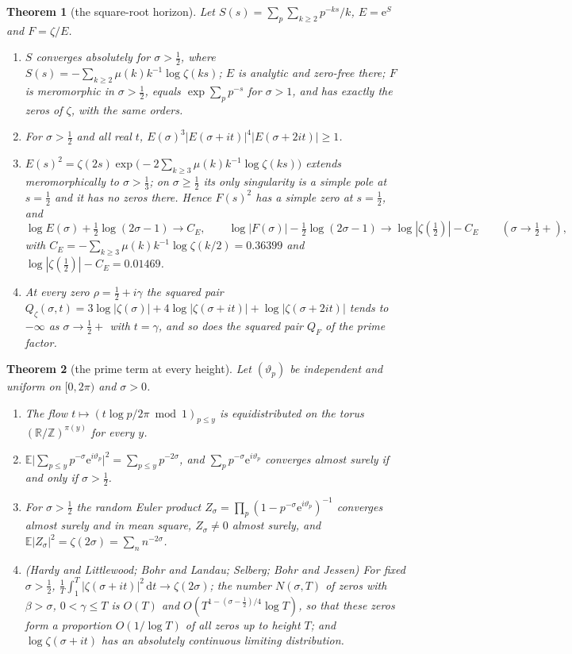 \documentclass[11pt]{article}
\newtheorem{theorem}{Theorem}[section]
\theoremstyle{definition}\newtheorem{definition}[theorem]{Definition}
\theoremstyle{remark}\newtheorem{remark}[theorem]{Remark}
\theoremstyle{definition}\newtheorem{axiom}{Axiom}
\newcommand{\R}{\mathbb R}\newcommand{\C}{\mathbb C}\newcommand{\N}{\mathbb N}\newcommand{\Z}{\mathbb Z}
\newcommand{\dd}{\,\mathrm d}\newcommand{\e}{\mathrm e}
\begin{document}
\begin{theorem}[the square-root horizon]\label{mt:horizon}
Let $S(s)=\sum_p\sum_{k\ge2}p^{-ks}/k$, $E=\e^S$ and $F=\zeta/E$.
\begin{enumerate}[label=\textup{(\roman*)}]
\item $S$ converges absolutely for $\sigma>\frac12$, where $S(s)=-\sum_{k\ge2}\mu(k)k^{-1}\log\zeta(ks)$; $E$ is analytic and zero-free there; $F$ is meromorphic in $\sigma>\frac12$, equals $\exp\sum_pp^{-s}$ for $\sigma>1$, and has exactly the zeros of $\zeta$, with the same orders.
\item For $\sigma>\frac12$ and all real $t$, $E(\sigma)^3|E(\sigma+it)|^4|E(\sigma+2it)|\ge1$.
\item $E(s)^2=\zeta(2s)\exp\bigl(-2\sum_{k\ge3}\mu(k)k^{-1}\log\zeta(ks)\bigr)$ extends meromorphically to $\sigma>\frac13$; on $\sigma\ge\frac12$ its only singularity is a simple pole at $s=\frac12$ and it has no zeros there. Hence $F(s)^2$ has a simple zero at $s=\frac12$, and
\[
\log E(\sigma)+\tfrac12\log(2\sigma-1)\to C_E,\qquad \log|F(\sigma)|-\tfrac12\log(2\sigma-1)\to\log|\zeta(\tfrac12)|-C_E\qquad(\sigma\to\tfrac12+),
\]
with $C_E=-\sum_{k\ge3}\mu(k)k^{-1}\log\zeta(k/2)=0.36399$ and $\log|\zeta(\frac12)|-C_E=0.01469$.
\item At every zero $\rho=\frac12+i\gamma$ the squared pair $Q_\zeta(\sigma,t)=3\log|\zeta(\sigma)|+4\log|\zeta(\sigma+it)|+\log|\zeta(\sigma+2it)|$ tends to $-\infty$ as $\sigma\to\frac12+$ with $t=\gamma$, and so does the squared pair $Q_F$ of the prime factor.
\end{enumerate}
\end{theorem}

\begin{theorem}[the prime term at every height]\label{mt:phases}
Let $(\vartheta_p)$ be independent and uniform on $[0,2\pi)$ and $\sigma>0$.
\begin{enumerate}[label=\textup{(\roman*)}]
\item The flow $t\mapsto(t\log p/2\pi\bmod1)_{p\le y}$ is equidistributed on the torus $(\R/\Z)^{\pi(y)}$ for every $y$.
\item $\mathbb E\bigl|\sum_{p\le y}p^{-\sigma}\e^{i\vartheta_p}\bigr|^2=\sum_{p\le y}p^{-2\sigma}$, and $\sum_pp^{-\sigma}\e^{i\vartheta_p}$ converges almost surely if and only if $\sigma>\frac12$.
\item For $\sigma>\frac12$ the random Euler product $Z_\sigma=\prod_p(1-p^{-\sigma}\e^{i\vartheta_p})^{-1}$ converges almost surely and in mean square, $Z_\sigma\ne0$ almost surely, and $\mathbb E|Z_\sigma|^2=\zeta(2\sigma)=\sum_nn^{-2\sigma}$.
\item \textup{(Hardy and Littlewood; Bohr and Landau; Selberg; Bohr and Jessen)} For fixed $\sigma>\frac12$, $\frac1T\int_1^T|\zeta(\sigma+it)|^2\dd t\to\zeta(2\sigma)$; the number $N(\sigma,T)$ of zeros with $\beta>\sigma$, $0<\gamma\le T$ is $O(T)$ and $O(T^{1-(\sigma-\frac12)/4}\log T)$, so that these zeros form a proportion $O(1/\log T)$ of all zeros up to height $T$; and $\log\zeta(\sigma+it)$ has an absolutely continuous limiting distribution.
\end{enumerate}
\end{theorem}
\end{document}
